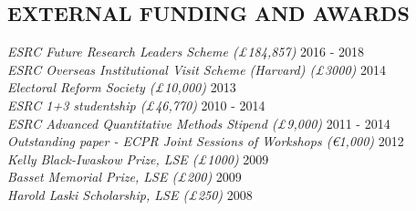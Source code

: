 \documentclass[centered]{res}
\begin{document}
\begin{resume}
\section{EXTERNAL FUNDING AND AWARDS}  {
{\sl ESRC Future Research Leaders Scheme (\pounds 184,857)} \hfill 2016 - 2018 \\
{\sl ESRC Overseas Institutional Visit Scheme (Harvard) (\pounds 3000)} \hfill 2014 \\
{\sl Electoral Reform Society (\pounds 10,000)} \hfill 2013 \\
{\sl ESRC 1+3 studentship (\pounds 46,770)} \hfill 2010 - 2014 \\
{\sl ESRC Advanced Quantitative Methods Stipend (\pounds 9,000)} \hfill 2011 - 2014 \\
{\sl Outstanding paper - ECPR Joint Sessions of Workshops (\euro 1,000)} \hfill 2012 \\
{\sl Kelly Black-Iwaskow Prize, LSE (\pounds 1000)} \hfill 2009 \\
{\sl Basset Memorial Prize, LSE (\pounds 200)} \hfill 2009 \\
\sl Harold Laski Scholarship, LSE (\pounds 250)} \hfill 2008 






\end{resume}
\end{document}
